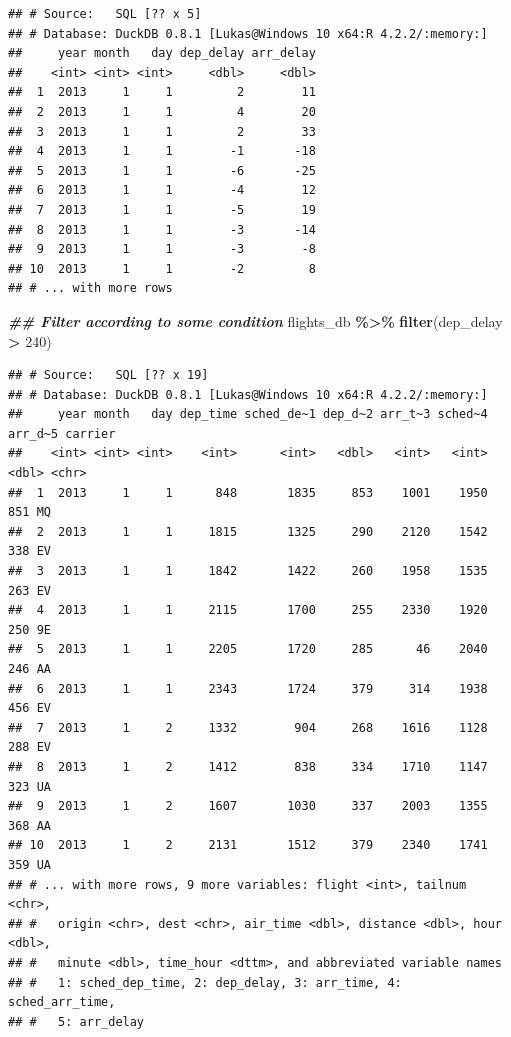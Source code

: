 \documentclass[
]{article}
\newenvironment{Shaded}{\begin{snugshade}}{\end{snugshade}}
\newcommand{\DecValTok}[1]{\textcolor[rgb]{0.00,0.00,0.81}{#1}}
\newcommand{\DocumentationTok}[1]{\textcolor[rgb]{0.56,0.35,0.01}{\textbf{\textit{#1}}}}
\newcommand{\FunctionTok}[1]{\textcolor[rgb]{0.13,0.29,0.53}{\textbf{#1}}}
\newcommand{\NormalTok}[1]{#1}
\newcommand{\SpecialCharTok}[1]{\textcolor[rgb]{0.81,0.36,0.00}{\textbf{#1}}}
\begin{document}
\begin{verbatim}
## # Source:   SQL [?? x 5]
## # Database: DuckDB 0.8.1 [Lukas@Windows 10 x64:R 4.2.2/:memory:]
##     year month   day dep_delay arr_delay
##    <int> <int> <int>     <dbl>     <dbl>
##  1  2013     1     1         2        11
##  2  2013     1     1         4        20
##  3  2013     1     1         2        33
##  4  2013     1     1        -1       -18
##  5  2013     1     1        -6       -25
##  6  2013     1     1        -4        12
##  7  2013     1     1        -5        19
##  8  2013     1     1        -3       -14
##  9  2013     1     1        -3        -8
## 10  2013     1     1        -2         8
## # ... with more rows
\end{verbatim}

\begin{Shaded}
\begin{Highlighting}[]
\DocumentationTok{\#\# Filter according to some condition}
\NormalTok{flights\_db }\SpecialCharTok{\%\textgreater{}\%} \FunctionTok{filter}\NormalTok{(dep\_delay }\SpecialCharTok{\textgreater{}} \DecValTok{240}\NormalTok{) }
\end{Highlighting}
\end{Shaded}

\begin{verbatim}
## # Source:   SQL [?? x 19]
## # Database: DuckDB 0.8.1 [Lukas@Windows 10 x64:R 4.2.2/:memory:]
##     year month   day dep_time sched_de~1 dep_d~2 arr_t~3 sched~4 arr_d~5 carrier
##    <int> <int> <int>    <int>      <int>   <dbl>   <int>   <int>   <dbl> <chr>  
##  1  2013     1     1      848       1835     853    1001    1950     851 MQ     
##  2  2013     1     1     1815       1325     290    2120    1542     338 EV     
##  3  2013     1     1     1842       1422     260    1958    1535     263 EV     
##  4  2013     1     1     2115       1700     255    2330    1920     250 9E     
##  5  2013     1     1     2205       1720     285      46    2040     246 AA     
##  6  2013     1     1     2343       1724     379     314    1938     456 EV     
##  7  2013     1     2     1332        904     268    1616    1128     288 EV     
##  8  2013     1     2     1412        838     334    1710    1147     323 UA     
##  9  2013     1     2     1607       1030     337    2003    1355     368 AA     
## 10  2013     1     2     2131       1512     379    2340    1741     359 UA     
## # ... with more rows, 9 more variables: flight <int>, tailnum <chr>,
## #   origin <chr>, dest <chr>, air_time <dbl>, distance <dbl>, hour <dbl>,
## #   minute <dbl>, time_hour <dttm>, and abbreviated variable names
## #   1: sched_dep_time, 2: dep_delay, 3: arr_time, 4: sched_arr_time,
## #   5: arr_delay
\end{verbatim}
\end{document}
